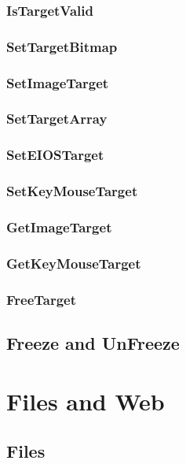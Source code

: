 \documentclass[a4paper]{report}
\begin{document}
\subsection{IsTargetValid}

\subsection{SetTargetBitmap}

\subsection{SetImageTarget}

\subsection{SetTargetArray}

\subsection{SetEIOSTarget}

\subsection{SetKeyMouseTarget}

\subsection{GetImageTarget}

\subsection{GetKeyMouseTarget}

\subsection{FreeTarget}

\section{Freeze and UnFreeze}

\chapter{Files and Web}

\section{Files}
\end{document}
